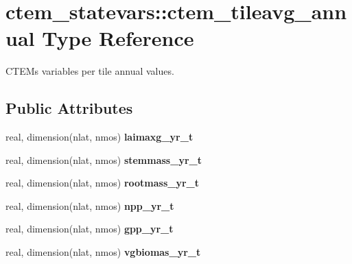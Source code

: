 \hypertarget{structctem__statevars_1_1ctem__tileavg__annual}{}\section{ctem\+\_\+statevars\+:\+:ctem\+\_\+tileavg\+\_\+annual Type Reference}
\label{structctem__statevars_1_1ctem__tileavg__annual}


C\+T\+E\+M\textquotesingle{}s variables per tile annual values.  


\subsection*{Public Attributes}
\begin{DoxyCompactItemize}
\item 
\hypertarget{structctem__statevars_1_1ctem__tileavg__annual_a74c168f8ddd57073094a8ba1ca80656e}{}real, dimension(nlat, nmos) {\bfseries laimaxg\+\_\+yr\+\_\+t}\label{structctem__statevars_1_1ctem__tileavg__annual_a74c168f8ddd57073094a8ba1ca80656e}

\item 
\hypertarget{structctem__statevars_1_1ctem__tileavg__annual_a7b677f309e05b36db2cf160075124313}{}real, dimension(nlat, nmos) {\bfseries stemmass\+\_\+yr\+\_\+t}\label{structctem__statevars_1_1ctem__tileavg__annual_a7b677f309e05b36db2cf160075124313}

\item 
\hypertarget{structctem__statevars_1_1ctem__tileavg__annual_a429417d149cdda1eb8f60c04200ff5d2}{}real, dimension(nlat, nmos) {\bfseries rootmass\+\_\+yr\+\_\+t}\label{structctem__statevars_1_1ctem__tileavg__annual_a429417d149cdda1eb8f60c04200ff5d2}

\item 
\hypertarget{structctem__statevars_1_1ctem__tileavg__annual_a5437ba9a8cf261ff001fac01c3daedf0}{}real, dimension(nlat, nmos) {\bfseries npp\+\_\+yr\+\_\+t}\label{structctem__statevars_1_1ctem__tileavg__annual_a5437ba9a8cf261ff001fac01c3daedf0}

\item 
\hypertarget{structctem__statevars_1_1ctem__tileavg__annual_a01a96a9b3fd78ad3c19fa4159a354bde}{}real, dimension(nlat, nmos) {\bfseries gpp\+\_\+yr\+\_\+t}\label{structctem__statevars_1_1ctem__tileavg__annual_a01a96a9b3fd78ad3c19fa4159a354bde}

\item 
\hypertarget{structctem__statevars_1_1ctem__tileavg__annual_ae7ea421581386c2ecbc9a85bb722e322}{}real, dimension(nlat, nmos) {\bfseries vgbiomas\+\_\+yr\+\_\+t}\label{structctem__statevars_1_1ctem__tileavg__annual_ae7ea421581386c2ecbc9a85bb722e322}


\end{DoxyCompactItemize}
